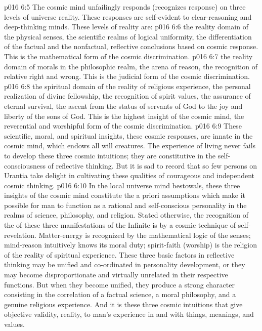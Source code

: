 \vs p016 6:5 The cosmic mind unfailingly responds (recognizes response) on three levels of universe reality. These responses are self\hyp{}evident to clear\hyp{}reasoning and deep\hyp{}thinking minds. These levels of reality are:
\vs p016 6:6 \bibnobreakspace {} the reality domain of the physical senses, the scientific realms of logical uniformity, the differentiation of the factual and the nonfactual, reflective conclusions based on cosmic response. This is the mathematical form of the cosmic discrimination.
\vs p016 6:7 \bibnobreakspace {} the reality domain of morals in the philosophic realm, the arena of reason, the recognition of relative right and wrong. This is the judicial form of the cosmic discrimination.
\vs p016 6:8 \bibnobreakspace {} the spiritual domain of the reality of religious experience, the personal realization of divine fellowship, the recognition of spirit values, the assurance of eternal survival, the ascent from the status of servants of God to the joy and liberty of the sons of God. This is the highest insight of the cosmic mind, the reverential and worshipful form of the cosmic discrimination.
\vs p016 6:9 \pc These scientific, moral, and spiritual insights, these cosmic responses, are innate in the cosmic mind, which endows all will creatures. The experience of living never fails to develop these three cosmic intuitions; they are constitutive in the self\hyp{}consciousness of reflective thinking. But it is sad to record that so few persons on Urantia take delight in cultivating these qualities of courageous and independent cosmic thinking.
\vs p016 6:10 \pc In the local universe mind bestowals, these three insights of the cosmic mind constitute the a priori assumptions which make it possible for man to function as a rational and self\hyp{}conscious personality in the realms of science, philosophy, and religion. Stated otherwise, the recognition of the  of these three manifestations of the Infinite is by a cosmic technique of self\hyp{}revelation. Matter\hyp{}energy is recognized by the mathematical logic of the senses; mind\hyp{}reason intuitively knows its moral duty; spirit\hyp{}faith (worship) is the religion of the reality of spiritual experience. These three basic factors in reflective thinking may be unified and co\hyp{}ordinated in personality development, or they may become disproportionate and virtually unrelated in their respective functions. But when they become unified, they produce a strong character consisting in the correlation of a factual science, a moral philosophy, and a genuine religious experience. And it is these three cosmic intuitions that give objective validity, reality, to man’s experience in and with things, meanings, and values.
